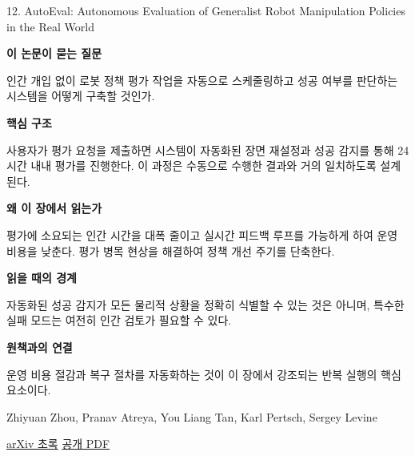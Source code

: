 \documentclass[11pt,openany]{book}
\begin{document}
\begin{termcard}{12. AutoEval: Autonomous Evaluation of Generalist Robot Manipulation Policies in the Real World}

\par

\medskip

{\sffamily\bfseries\color{deepblue} 이 논문이 묻는 질문}\par

인간 개입 없이 로봇 정책 평가 작업을 자동으로 스케줄링하고 성공 여부를 판단하는 시스템을 어떻게 구축할 것인가.

\smallskip

{\sffamily\bfseries\color{deepblue} 핵심 구조}\par

사용자가 평가 요청을 제출하면 시스템이 자동화된 장면 재설정과 성공 감지를 통해 24 시간 내내 평가를 진행한다. 이 과정은 수동으로 수행한 결과와 거의 일치하도록 설계된다.

\smallskip

{\sffamily\bfseries\color{deepblue} 왜 이 장에서 읽는가}\par

평가에 소요되는 인간 시간을 대폭 줄이고 실시간 피드백 루프를 가능하게 하여 운영 비용을 낮춘다. 평가 병목 현상을 해결하여 정책 개선 주기를 단축한다.

\smallskip

{\sffamily\bfseries\color{coral} 읽을 때의 경계}\par

자동화된 성공 감지가 모든 물리적 상황을 정확히 식별할 수 있는 것은 아니며, 특수한 실패 모드는 여전히 인간 검토가 필요할 수 있다.

\smallskip

{\sffamily\bfseries\color{teal} 원책과의 연결}\par

운영 비용 절감과 복구 절차를 자동화하는 것이 이 장에서 강조되는 반복 실행의 핵심 요소이다.

\medskip

{\footnotesize\color{muted} Zhiyuan Zhou, Pranav Atreya, You Liang Tan, Karl Pertsch, Sergey Levine\par

\href{https://arxiv.org/abs/2503.24278}{arXiv 초록} \quad \href{https://arxiv.org/pdf/2503.24278}{공개 PDF}\par}

\end{termcard}
\end{document}

